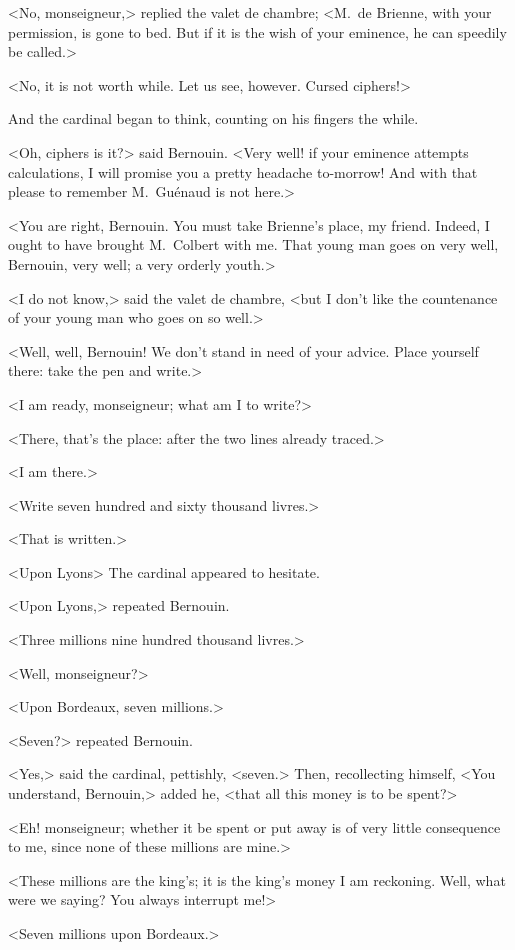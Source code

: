 <No, monseigneur,> replied the valet de chambre; <M.~de Brienne, with your permission, is gone to bed. But if it is the wish of your eminence, he can speedily be called.>

<No, it is not worth while. Let us see, however. Cursed ciphers!>

And the cardinal began to think, counting on his fingers the while.

<Oh, ciphers is it?> said Bernouin. <Very well! if your eminence attempts calculations, I will promise you a pretty headache to-morrow! And with that please to remember M.~Guénaud is not here.>

<You are right, Bernouin. You must take Brienne's place, my friend. Indeed, I ought to have brought M.~Colbert with me. That young man goes on very well, Bernouin, very well; a very orderly youth.>

<I do not know,> said the valet de chambre, <but I don't like the countenance of your young man who goes on so well.>

<Well, well, Bernouin! We don't stand in need of your advice. Place yourself there: take the pen and write.>

<I am ready, monseigneur; what am I to write?>

<There, that's the place: after the two lines already traced.>

<I am there.>

<Write seven hundred and sixty thousand livres.>

<That is written.>

<Upon Lyons\longdash> The cardinal appeared to hesitate.

<Upon Lyons,> repeated Bernouin.

<Three millions nine hundred thousand livres.>

<Well, monseigneur?>

<Upon Bordeaux, seven millions.>

<Seven?> repeated Bernouin.

<Yes,> said the cardinal, pettishly, <seven.> Then, recollecting himself, <You understand, Bernouin,> added he, <that all this money is to be spent?>

<Eh! monseigneur; whether it be spent or put away is of very little consequence to me, since none of these millions are mine.>

<These millions are the king's; it is the king's money I am reckoning. Well, what were we saying? You always interrupt me!>

<Seven millions upon Bordeaux.>


